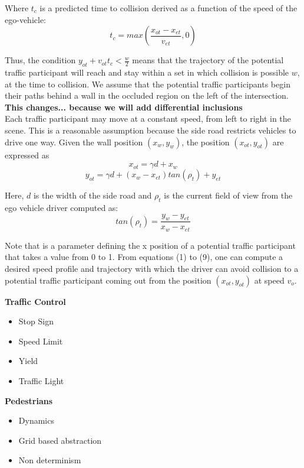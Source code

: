\documentclass{easychair}
\begin{document}
Where $t_c$  is a predicted time to collision derived as a function of the speed of the ego-vehicle:
\begin{equation}
	t_c=max(\frac{x_{ot}-x_{et}}{v_{et}},0)
\end{equation}

Thus, the condition $y_{ot}+v_{ot}t_c < \frac{w}{2}$  means that the trajectory of the potential traffic participant will reach and stay within a set in which collision is possible $w$, at the time to collision. We assume that the potential traffic participants begin their paths behind a wall in the occluded region on the left of the intersection.\\
\textbf{This changes... because we will add differential inclusions}\\
Each traffic participant may move at a constant speed, from left to right in the scene. This is a reasonable assumption because the side road restricts vehicles to drive one way. Given the wall position $(x_w,y_w)$, the position $(x_{ot},y_{ot})$  are expressed as
\begin{equation}
 x_{ot}=\gamma d + x_{w}
\end{equation}
\begin{equation}
y_{ot} = \gamma d + (x_w - x_{et})tan(\rho_t) +y_{et}
\end{equation}

Here, $d$ is the width of the side road and $\rho_t$ is the current field of view from the ego vehicle driver computed as:
\begin{equation}
	tan(\rho_t) = \frac{y_w-y_{et}}{x_w - x_{et}}
\end{equation}

Note that   is a parameter defining the x position of a potential traffic participant that takes a value from 0 to 1. From equations (1) to (9), one can compute a desired speed profile and trajectory with which the driver can avoid collision to a potential traffic participant coming out from the position $(x_{ot},y_{ot})$ at speed $v_o$.


\noindent \textbf{Traffic Control}
\begin{itemize}
	\item Stop Sign
	\item Speed Limit
	\item Yield
	\item Traffic Light
\end{itemize}

\noindent \textbf{Pedestrians}
\begin{itemize}
	\item Dynamics
	\item Grid based abstraction
	\item Non determinism
\end{itemize}
\end{document}
